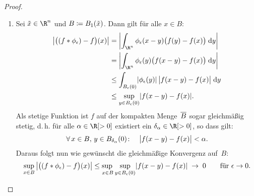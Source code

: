 \begin{proof}
    \begin{enumerate}[(1)]
        \item
            Sei $\tilde x\in\R^n$ und $B\defeq B_1(\tilde x)$. Dann gilt für
            alle $x\in B$:
            \begin{align*}
                \abs*{\bigl( (f\ast\phi_\epsilon)-f\bigr)(x)}
                &= \abs*{ \int_{\R^n} \phi_\epsilon(x-y) \bigl( f(y)-f(x) \bigr)
                \dif{y}}
                \\
                &= \abs*{ \int_{\R^n} \phi_\epsilon(y) \bigl( f(x-y) - f(x) \bigr)
                \dif{y}}
                \\
                &\leq \int_{B_\epsilon(0)} \abs{\phi_\epsilon(y)} \,
                    \abs[\big]{f(x-y) - f(x)} \dif{y}
                \\
                &\leq \sup_{y\in B_\epsilon(0)} \abs{f(x-y)-f(x)}
            . \end{align*}
            Als stetige Funktion ist $f$ auf der kompakten Menge~$\setclosure{B}$
            sogar gleichmäßig stetig, d.\,h. für alle $\alpha\in\R[>0]$
            existiert ein $\delta_\alpha\in\R[>0]$, so dass gilt:
            \[ \forall\,x\in B,\,y\in B_{\delta_\alpha}(0)\colon\quad
                \abs[\big]{f(x-y)-f(x)} < \alpha
            . \]
            Daraus folgt nun wie gewünscht die gleichmäßige Konvergenz auf~$B$:
            \[ \sup_{x\in B}\, \abs*{\bigl( (f\ast\phi_\epsilon)-f\bigr)(x)}
                \leq \adjustlimits\sup_{x\in B}
                    \sup_{y\in B_\epsilon(0)} \abs{f(x-y)-f(x)}
                \mkern5mu\to\mkern5mu 0 \fuer \epsilon\to 0
            . \]
            

\end{enumerate}
\end{proof}
